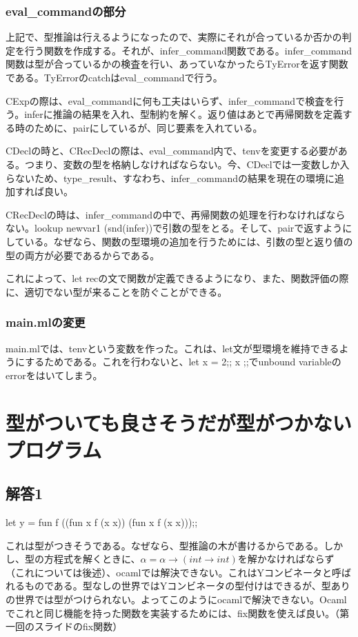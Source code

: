 \documentclass[uplatex,12pt]{jsarticle}
\begin{document}
\subsubsection{eval\_commandの部分}
上記で、型推論は行えるようになったので、実際にそれが合っているか否かの判定を行う関数を作成する。それが、infer\_command関数である。infer\_command関数は型が合っているかの検査を行い、あっていなかったらTyErrorを返す関数である。TyErrorのcatchはeval\_commandで行う。

CExpの際は、eval\_commandに何も工夫はいらず、infer\_commandで検査を行う。inferに推論の結果を入れ、型制約を解く。返り値はあとで再帰関数を定義する時のために、pairにしているが、同じ要素を入れている。

CDeclの時と、CRecDeclの際は、eval\_command内で、tenvを変更する必要がある。つまり、変数の型を格納しなければならない。今、CDeclでは一変数しか入らないため、type\_result、すなわち、infer\_commandの結果を現在の環境に追加すれば良い。

CRecDeclの時は、infer\_commandの中で、再帰関数の処理を行わなければならない。lookup newvar1 (snd(infer))で引数の型をとる。そして、pairで返すようにしている。なぜなら、関数の型環境の追加を行うためには、引数の型と返り値の型の両方が必要であるからである。

これによって、let recの文で関数が定義できるようになり、また、関数評価の際に、適切でない型が来ることを防ぐことができる。

\subsubsection{main.mlの変更}
main.mlでは、tenvという変数を作った。これは、let文が型環境を維持できるようにするためである。これを行わないと、let x = 2;; x ;;でunbound variableのerrorをはいてしまう。


\section{型がついても良さそうだが型がつかないプログラム}

\subsection{解答1}

let y = fun f \rightarrow ((fun x \rightarrow f (x x)) (fun x \rightarrow f (x x)));;

これは型がつきそうである。なぜなら、型推論の木が書けるからである。しかし、型の方程式を解くときに、$\alpha = \alpha \rightarrow (int \rightarrow int)$を解かなければならず（これについては後述）、ocamlでは解決できない。これはYコンビネータと呼ばれるものである。型なしの世界ではYコンビネータの型付けはできるが、型ありの世界では型がつけられない。よってこのようにocamlで解決できない。Ocamlでこれと同じ機能を持った関数を実装するためには、fix関数を使えば良い。（第一回のスライドのfix関数）
\end{document}
